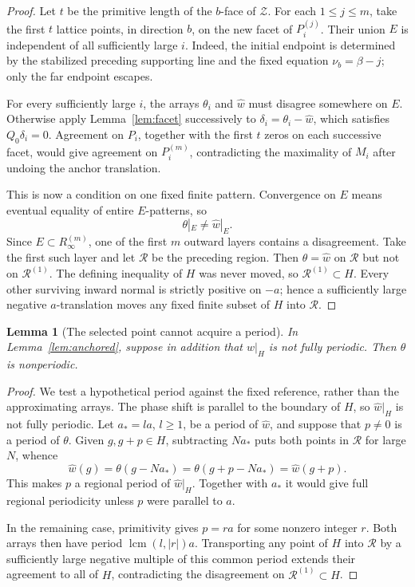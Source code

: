 \documentclass[11pt]{article}
\numberwithin{equation}{section}
\newtheorem{lemma}[theorem]{Lemma}
\theoremstyle{definition}
\theoremstyle{remark}
\newcommand{\ZZ}{\mathcal Z}
\newcommand{\RR}{\mathcal R}
\DeclareMathOperator{\lcm}{lcm}
\begin{document}
\begin{proof}
Let $t$ be the primitive length of the $b$-face of $\ZZ$. For each $1\le j\le m$, take the first $t$
lattice points, in direction $b$, on the new facet of $P_i^{(j)}$. Their union $E$ is independent of
all sufficiently large $i$. Indeed, the initial endpoint is determined by the stabilized preceding
supporting line and the fixed equation $\nu_b=\beta-j$; only the far endpoint escapes.

For every sufficiently large $i$, the arrays $\theta_i$ and $\widehat w$ must disagree somewhere on
$E$. Otherwise apply Lemma~\ref{lem:facet} successively to $\delta_i=\theta_i-\widehat w$, which
satisfies $Q_0\delta_i=0$. Agreement on $P_i$, together with the first $t$ zeros on each successive
facet, would give agreement on $P_i^{(m)}$, contradicting the maximality of $M_i$ after undoing the
anchor translation.

This is now a condition on one fixed finite pattern. Convergence on $E$ means eventual equality of
entire $E$-patterns, so
\[
 \theta|_E\ne\widehat w|_E.
\]
Since $E\subset R_\infty^{(m)}$, one of the first $m$ outward layers contains a disagreement. Take
the first such layer and let $\RR$ be the preceding region. Then $\theta=\widehat w$ on $\RR$ but
not on $\RR^{(1)}$. The defining inequality of $H$ was never moved, so $\RR^{(1)}\subset H$. Every
other surviving inward normal is strictly positive on $-a$; hence a sufficiently large negative
$a$-translation moves any fixed finite subset of $H$ into $\RR$.
\end{proof}

\begin{lemma}[The selected point cannot acquire a period]\label{lem:nonperiodic}
In Lemma~\ref{lem:anchored}, suppose in addition that $w|_H$ is not fully periodic. Then $\theta$ is
nonperiodic.
\end{lemma}
\begin{proof}
We test a hypothetical period against the fixed reference, rather than the approximating arrays.
The phase shift is parallel to the boundary of $H$, so $\widehat w|_H$ is not fully periodic. Let
$a_*=la$, $l\ge1$, be a period of $\widehat w$, and suppose that $p\ne0$ is a period of $\theta$.
Given $g,g+p\in H$, subtracting $Na_*$ puts both points in $\RR$ for large $N$, whence
\[
 \widehat w(g)=\theta(g-Na_*)
 =\theta(g+p-Na_*)=\widehat w(g+p).
\]
This makes $p$ a regional period of $\widehat w|_H$. Together with $a_*$ it would give full regional
periodicity unless $p$ were parallel to $a$.

In the remaining case, primitivity gives $p=ra$ for some nonzero integer $r$. Both arrays then have
period $\lcm(l,|r|)a$. Transporting any point of $H$ into $\RR$ by a sufficiently large negative
multiple of this common period extends their agreement to all of $H$, contradicting the disagreement
on $\RR^{(1)}\subset H$.
\end{proof}
\end{document}
